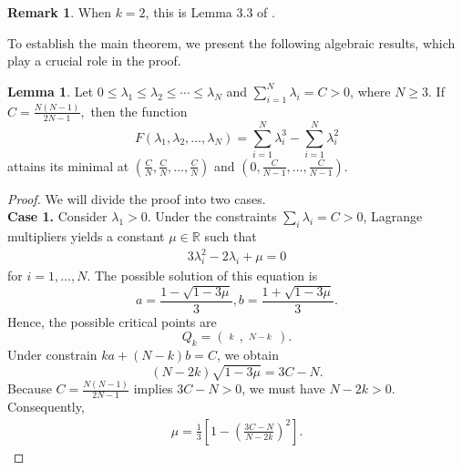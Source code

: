 \documentclass[11pt, reqno]{amsart}
\numberwithin{equation}{section}
\theoremstyle{definition}
\newtheorem{lemma}[thm]{Lemma}
\newtheorem{remark}[thm]{Remark}
\begin{document}
	\begin{remark}
		When $k=2$, this is Lemma 3.3 of \cite{CW}.
	\end{remark}
	To establish the main theorem, we present the following algebraic results, which play a crucial role in the proof.
	\begin{lemma}\label{lemma1}
		Let $0\le {\lambda }_1\le {\lambda }_2\le \cdots \le {\lambda }_N$ and $\sum\limits_{i=1}^{N}{{\lambda }_i}=C>0$, where $N\geq3$. If $C=\frac{N(N-1)}{2N-1},$ then the  function
		\[F(\lambda _{1},\lambda _{2},\ldots,\lambda _{N})=\sum\limits_{i=1}^{N}{\lambda _{i}^3}-\sum\limits_{i=1}^{N}{\lambda _{i}^2}\]
		attains its minimal at $\left( \frac{C}{N},\frac{C}{N},\ldots ,\frac{C}{N} \right)$ and $\left( 0,\frac{C}{N-1},\ldots ,\frac{C}{N-1} \right).$
	\end{lemma}
	\begin{proof} 
		We will divide the proof into two cases.\\
		\textbf{Case 1.} Consider ${\lambda }_1>0$. Under the constraints $\sum\limits_{i}{{{\lambda }_{i}}}=C>0$, Lagrange multipliers yields a constant $\mu \in \mathbb{R}$ such that
		\begin{eqnarray}
			3\lambda _{i}^2-2{\lambda }_i+\mu =0\label{lambda1}
		\end{eqnarray} 
		for $i=1,\ldots ,N.$
		The possible solution of this equation is 
		\[a=\frac{1-\sqrt{1-3\mu }}{3},b=\frac{1+\sqrt{1-3\mu }}{3}.\]
		Hence, the possible critical points are 
		\[Q_k=\left( \overset{k}{\mathop{\overset\frown{a,\ldots ,a}}}\,,\overset{N-k}{\mathop{\overset\frown{b,\ldots ,b}}}\, \right).\]
		Under constrain  $ka+(N-k)b=C$, we obtain
		$$(N-2k)\sqrt{1-3\mu }=3C-N.$$
		Because $C=\frac{N(N-1)}{2N-1}$ implies $3C-N>0$, we must have $N-2k>0$. Consequently, 
		\begin{eqnarray}
			\mu =\frac{1}{3}[1-{\left( \frac{3C-N}{N-2k} \right)^2}].\label{lambda2}
		\end{eqnarray} 
		

\end{proof}
\end{document}
